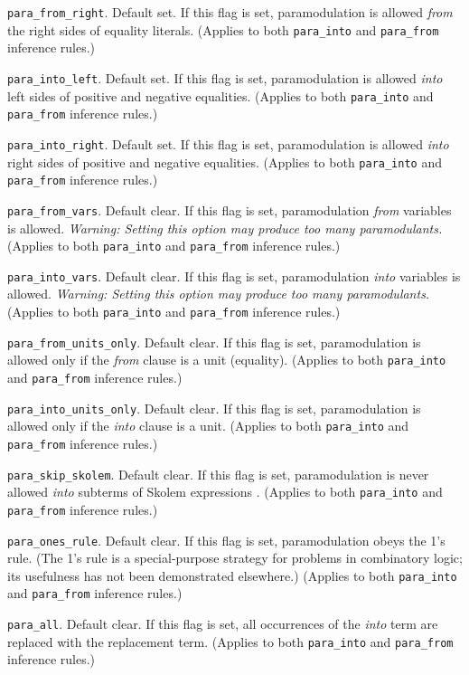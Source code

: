 \documentclass[11pt]{article}
\begin{document}
\noindent
\verb:para_from_right:.  Default set.  If this flag is set,
paramodulation is allowed {\it from} the right sides of equality literals.
(Applies to both \verb:para_into: and \verb:para_from: inference rules.)

\noindent
\verb:para_into_left:.  Default set.  If this flag is set,
paramodulation is allowed {\it into} left sides of positive and negative
equalities.
(Applies to both \verb:para_into: and \verb:para_from: inference rules.)

\noindent
\verb:para_into_right:.  Default set.  If this flag is set,
paramodulation is allowed {\it into} right sides of positive and negative
equalities.  (Applies to both
\verb:para_into: and \verb:para_from: inference rules.)

\noindent
\verb:para_from_vars:.  Default clear.  If this flag is set,
paramodulation {\it from} variables is allowed.
{\em Warning: Setting this option may produce too many paramodulants.}
(Applies to both \verb:para_into: and \verb:para_from: inference rules.)

\noindent
\verb:para_into_vars:.  Default clear.  If this flag is set,
paramodulation {\it into} variables is allowed.
{\em Warning: Setting this option may produce too many paramodulants.}
(Applies to both \verb:para_into: and \verb:para_from: inference rules.)

\noindent
\verb:para_from_units_only:.  Default clear.  If this flag is set,
paramodulation is allowed only if the {\it from} clause is a unit (equality).
(Applies to both \verb:para_into: and \verb:para_from: inference rules.)

\noindent
\verb:para_into_units_only:.  Default clear.  If this flag is set,
paramodulation is allowed only if the {\it into} clause is a unit.
(Applies to both \verb:para_into: and \verb:para_from: inference rules.)

\noindent
\verb:para_skip_skolem:.  Default clear.  If this flag is set,
paramodulation is never allowed {\it into} subterms of Skolem
expressions \cite{skolem-aaai}.  (Applies to both \verb:para_into: and
\verb:para_from: inference rules.)

\noindent
\verb:para_ones_rule:.  Default clear.  If this flag is set,
paramodulation obeys the 1's rule.  (The 1's rule is a special-purpose
strategy for problems in combinatory logic; its usefulness has not
been demonstrated elsewhere.)  (Applies to both \verb:para_into: and
\verb:para_from: inference rules.)

\noindent
\verb:para_all:.  Default clear.  If this flag is set,
all occurrences of the {\it into} term are replaced with the
replacement term.  (Applies to both \verb:para_into: and
\verb:para_from: inference rules.)
\end{document}
